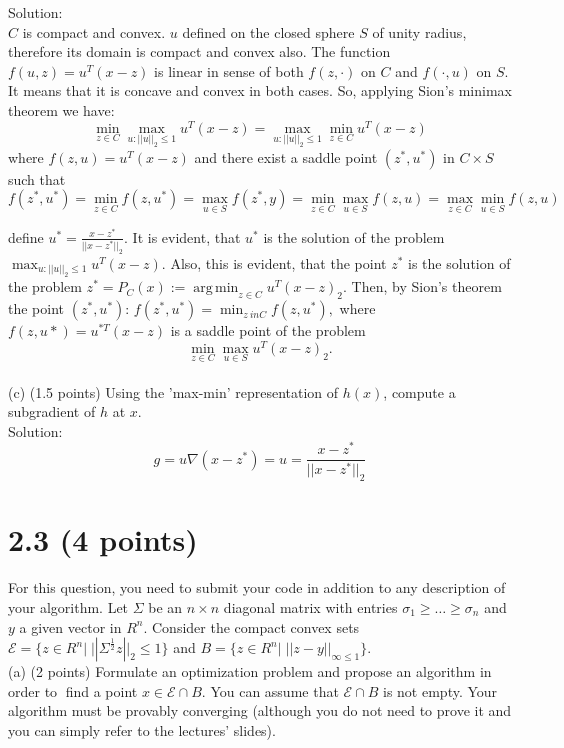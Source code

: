 \documentclass{article}
\begin{document}
Solution: \\
$C$ is compact and convex. $u$ defined on the closed sphere $S$ of unity radius, therefore its domain is compact and convex also. The function $f(u, z) = u^T(x - z)$ is linear 
in sense of both $f(z, \cdot)$ on $C$ and $f(\cdot, u)$ 
on $S.$ It means that it is concave and convex in both cases. So, applying Sion's minimax theorem  we have:\\
$$
\min_{z \in C} \max_{u:||u||_2 \leq 1} u^T(x - z) = 
\max_{u:||u||_2 \leq 1} \min_{z \in C} u^T(x - z)
$$
where ${f(z, u) = u^T(x - z)}$
and there exist a saddle point $(z^*, u^*)$ in $C \times S$
such that 
$$
f(z^*, u^*) = \min_{z \in C} f(z, u^*) = 
\max_{u \in S} f(z^*, y) = \min_{z \in C} \max_{u \in S} f(z, u) = \max_{z \in C} \min_{u \in S}  f(z, u)
$$

define $u^* = \frac{x - z^*}{||x - z^*||_2}.$ It is evident, that $u^*$ is the solution of the problem 
$\max_{u:||u||_2 \leq 1} u^T(x - z).$ Also, this is evident, that the point $z^*$ is the solution of the problem 
${z^* = P_C(x) := \operatorname*{arg\,min}_{z \in C}
	u^T(x - z)_2}.$ 
Then, by Sion's theorem the point 
${(z^*, u^*): \, f(z^*, u^*)} = \min_{z \ in C} f(z, u^*),$
where ${f(z, u*) = u^{*T}(x - z)}$
is a saddle point of the problem 
$$
\min_{z \in C} \max_{u \in S} u^T(x - z)_2.
$$
\\

(c) (1.5 points) Using the 'max-min' representation of $h(x)$, compute a subgradient of $h$ at $x$.
\\

Solution:
$$
g = u \nabla (x - z^*) = u = \frac{x - z^*}{||x - z^*||_2}
$$

\section*{2.3 (4 points)} 

For this question, you need to submit your code in addition to any description
of your algorithm. Let $\Sigma$ be an $n \times n$ diagonal matrix with entries 
$\sigma_1 \geq \dots \geq \sigma_n$ and $y$ a given vector 
in $R^n.$ Consider the compact convex sets 
$\mathcal{E} = \{z \in R^n|\; 
||\Sigma ^{\frac{1}{2} } z||_2 \leq 1\}$
and $B=\{z \in R^n|\; ||z-y||_{\infty \leq 1} \}.$ \\

(a) (2 points) Formulate an optimization problem and propose an algorithm in order to find a point
$x \in \mathcal{E} \cap B.$ You can assume that $\mathcal{E} \cap B$ is not empty. Your algorithm must be provably converging (although you do not need to prove it and you can simply refer to the lectures' slides).
\end{document}
